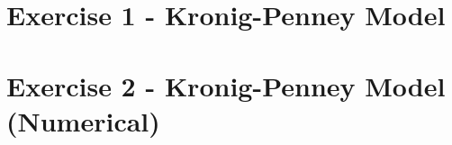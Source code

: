 








\section{Exercise 1 - Kronig-Penney Model}

\section{Exercise 2 - Kronig-Penney Model (Numerical)}



